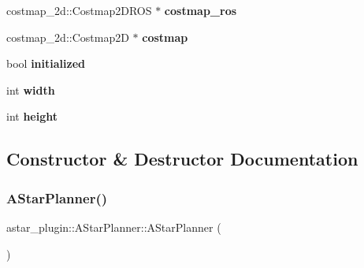 \begin{DoxyCompactItemize}
\mbox{\label{classastar__plugin_1_1_a_star_planner_a1be22c40d97241edb0a60b7bd3c332f3}} 
costmap\+\_\+2d\+::\+Costmap2\+D\+R\+OS $\ast$ {\bfseries costmap\+\_\+ros}
\item 
\mbox{\label{classastar__plugin_1_1_a_star_planner_afeaa9448af26fc54e8adb0a906bd6324}} 
costmap\+\_\+2d\+::\+Costmap2D $\ast$ {\bfseries costmap}
\item 
\mbox{\label{classastar__plugin_1_1_a_star_planner_a3befa689d0be167cbde58b71c635f5ae}} 
bool {\bfseries initialized}
\item 
\mbox{\label{classastar__plugin_1_1_a_star_planner_a712676c797f8a99a81b7aa48e02d227b}} 
int {\bfseries width}
\item 
\mbox{\label{classastar__plugin_1_1_a_star_planner_ad3806c8e75f4008de6b4ba1a1cbd2c42}} 
int {\bfseries height}
\end{DoxyCompactItemize}


\subsection{Constructor \& Destructor Documentation}
\mbox{\label{classastar__plugin_1_1_a_star_planner_a709090708527da7d103f7c9373f4b651}} 
\subsubsection{\texorpdfstring{A\+Star\+Planner()}{AStarPlanner()}\hspace{0.1cm}{\footnotesize\ttfamily [1/3]}}
{\footnotesize\ttfamily astar\+\_\+plugin\+::\+A\+Star\+Planner\+::\+A\+Star\+Planner (\begin{DoxyParamCaption}{ }\end{DoxyParamCaption})}



